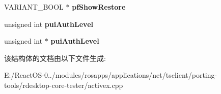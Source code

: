 \begin{DoxyCompactItemize}
V\+A\+R\+I\+A\+N\+T\+\_\+\+B\+O\+OL $\ast$ {\bfseries pf\+Show\+Restore}
\item 
\mbox{\label{struct_m_s_t_s_c_lib_1_1_i_ms_rdp_client_advanced_settings4_vtbl_a1f55effc794d530dbcd10d34095bbe11}} 
unsigned int {\bfseries pui\+Auth\+Level}
\item 
\mbox{\label{struct_m_s_t_s_c_lib_1_1_i_ms_rdp_client_advanced_settings4_vtbl_a67734b071bb5bbf25895228cc6a7e2a2}} 
unsigned int $\ast$ {\bfseries pui\+Auth\+Level}
\end{DoxyCompactItemize}


该结构体的文档由以下文件生成\+:\begin{DoxyCompactItemize}
\item 
E\+:/\+React\+O\+S-\/0../modules/rosapps/applications/net/tsclient/porting-\/tools/rdesktop-\/core-\/tester/activex.\+cpp\end{DoxyCompactItemize}

